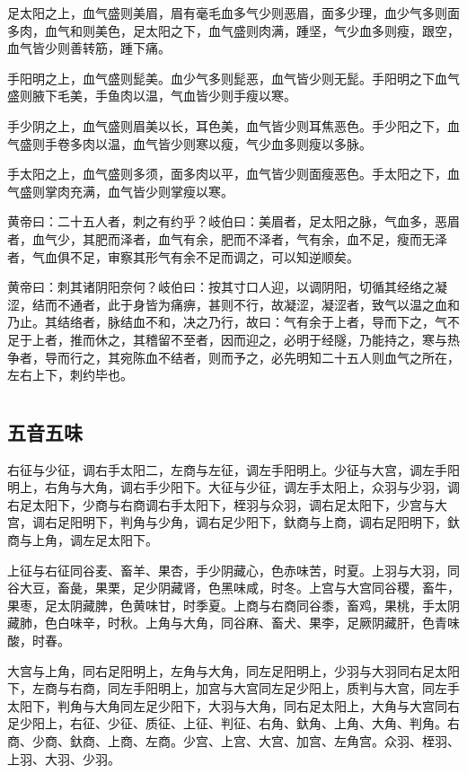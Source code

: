 \documentclass[12pt,UTF8]{ctexbook}
\begin{document}
	足太阳之上，血气盛则美眉，眉有毫毛血多气少则恶眉，面多少理，血少气多则面多肉，血气和则美色，足太阳之下，血气盛则肉满，踵坚，气少血多则瘦，跟空，血气皆少则善转筋，踵下痛。
	
	手阳明之上，血气盛则髭美。血少气多则髭恶，血气皆少则无髭。手阳明之下血气盛则腋下毛美，手鱼肉以温，气血皆少则手瘦以寒。
	
	手少阴之上，血气盛则眉美以长，耳色美，血气皆少则耳焦恶色。手少阳之下，血气盛则手卷多肉以温，血气皆少则寒以瘦，气少血多则瘦以多脉。
	
	手太阳之上，血气盛则多须，面多肉以平，血气皆少则面瘦恶色。手太阳之下，血气盛则掌肉充满，血气皆少则掌瘦以寒。
	
	黄帝曰：二十五人者，刺之有约乎？岐伯曰：美眉者，足太阳之脉，气血多，恶眉者，血气少，其肥而泽者，血气有余，肥而不泽者，气有余，血不足，瘦而无泽者，气血俱不足，审察其形气有余不足而调之，可以知逆顺矣。
	
	黄帝曰：刺其诸阴阳奈何？岐伯曰：按其寸口人迎，以调阴阳，切循其经络之凝涩，结而不通者，此于身皆为痛痹，甚则不行，故凝涩，凝涩者，致气以温之血和乃止。其结络者，脉结血不和，决之乃行，故曰：气有余于上者，导而下之，气不足于上者，推而休之，其稽留不至者，因而迎之，必明于经隧，乃能持之，寒与热争者，导而行之，其宛陈血不结者，则而予之，必先明知二十五人则血气之所在，左右上下，刺约毕也。
	
	\part{}
	\chapter{五音五味}
	
	右征与少征，调右手太阳二，左商与左征，调左手阳明上。少征与大宫，调左手阳明上，右角与大角，调右手少阳下。大征与少征，调左手太阳上，众羽与少羽，调右足太阳下，少商与右商调右手太阳下，桎羽与众羽，调右足太阳下，少宫与大宫，调右足阳明下，判角与少角，调右足少阳下，釱商与上商，调右足阳明下，釱商与上角，调左足太阳下。
	
	上征与右征同谷麦、畜羊、果杏，手少阴藏心，色赤味苦，时夏。上羽与大羽，同谷大豆，畜彘，果栗，足少阴藏肾，色黑味咸，时冬。上宫与大宫同谷稷，畜牛，果枣，足太阴藏脾，色黄味甘，时季夏。上商与右商同谷黍，畜鸡，果桃，手太阴藏肺，色白味辛，时秋。上角与大角，同谷麻、畜犬、果李，足厥阴藏肝，色青味酸，时春。
	
	大宫与上角，同右足阳明上，左角与大角，同左足阳明上，少羽与大羽同右足太阳下，左商与右商，同左手阳明上，加宫与大宫同左足少阳上，质判与大宫，同左手太阳下，判角与大角同左足少阳下，大羽与大角，同右足太阳上，大角与大宫同右足少阳上，右征、少征、质征、上征、判征、右角、釱角、上角、大角、判角。右商、少商、釱商、上商、左商。少宫、上宫、大宫、加宫、左角宫。众羽、桎羽、上羽、大羽、少羽。
	
\end{document}
